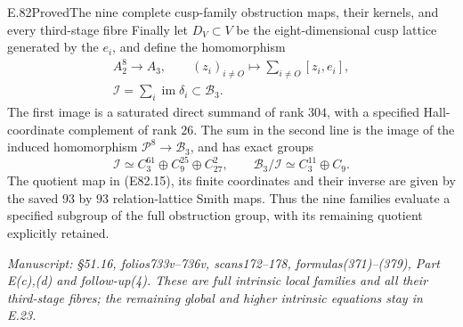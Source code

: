 \begin{statement}{E.82}{Proved}{The nine complete cusp-family obstruction maps, their kernels, and every third-stage fibre}
Finally let $D_V\subset V$ be the eight-dimensional cusp
lattice generated by the $e_i$, and define the homomorphism
\[
 \begin{gathered}
 A_2^8\longrightarrow A_3,\qquad
       (z_i)_{i\ne O}\longmapsto\sum_{i\ne O}[z_i,e_i],\\
 \mathscr I=\sum_i\operatorname{im}\delta_i
       \subset\mathcal B_3.
 \end{gathered}
 \tag{E82.14}
\]
The first image is a saturated direct summand of rank $304$,
with a specified Hall-coordinate complement of rank $26$.
The sum in the second line is the image of the induced
homomorphism $\mathcal P^8\to\mathcal B_3$, and has exact
groups
\[
 \mathscr I\simeq C_3^{61}\oplus C_9^{25}\oplus C_{27}^2,
 \qquad
 \mathcal B_3/\mathscr I\simeq C_3^{11}\oplus C_9.
 \tag{E82.15}
\]
The quotient map in (E82.15), its finite coordinates and their
inverse are given by the saved $93$ by $93$ relation-lattice
Smith maps. Thus the nine families evaluate a specified
subgroup of the full obstruction group, with its remaining
quotient explicitly retained.

\emph{Manuscript: \S51.16, folios733v--736v,
scans172--178, formulas(371)--(379), Part E(c),(d)
and follow-up(4). These are full intrinsic local families
and all their third-stage fibres; the remaining global and
higher intrinsic equations stay in E.23.}
\end{statement}

